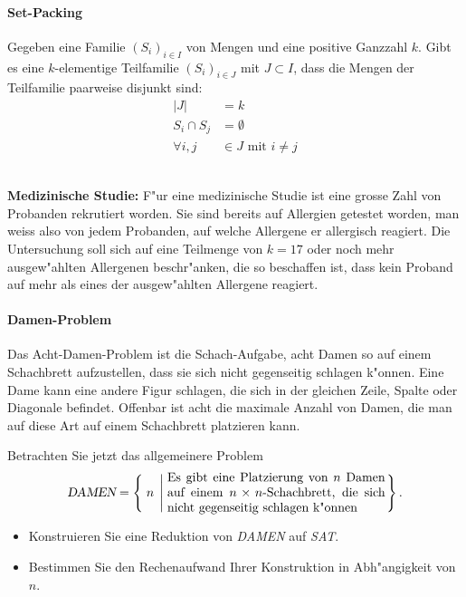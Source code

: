 \paragraph{Set-Packing} Gegeben eine Familie \( (S_i)_{i \in I} \) von Mengen und eine positive Ganzzahl \(k\). Gibt es eine \(k\)-elementige Teilfamilie \( (S_i)_{i \in J} \) mit \( J \subset I \), dass die Mengen der Teilfamilie paarweise disjunkt sind:
\begin{align*}
    \vert J \vert &= k \\
    S_i \cap S_j &= \emptyset \\
    \forall i,j &\in J \text{ mit } i \neq j
\end{align*}
\\
\textbf{Medizinische Studie:} F"ur eine medizinische Studie ist eine grosse Zahl von Probanden rekrutiert worden. Sie sind bereits auf Allergien getestet worden, man weiss also von jedem Probanden, auf welche Allergene er allergisch reagiert. Die Untersuchung soll sich auf eine Teilmenge von $k=17$ oder noch mehr ausgew"ahlten Allergenen beschr"anken, die so beschaffen ist, dass kein Proband auf mehr als  eines der ausgew"ahlten Allergene reagiert.
\paragraph{Damen-Problem}
Das Acht-Damen-Problem ist die Schach-Aufgabe, acht Damen so auf einem
Schachbrett aufzustellen, dass sie sich nicht gegenseitig schlagen k"onnen.
Eine Dame kann eine andere Figur schlagen, die sich in der gleichen Zeile,
Spalte oder Diagonale befindet.
Offenbar ist acht die maximale Anzahl von Damen, die man auf diese Art auf
einem Schachbrett platzieren kann.

Betrachten Sie jetzt das allgemeinere Problem
\[
\textsl{DAMEN}
=
\left\{\; n
\;\left|\;
\begin{minipage}{0.5\hsize}
Es gibt eine Platzierung von $n$ Damen auf einem $n\times n$-Schachbrett,
die sich nicht gegenseitig schlagen k"onnen
\end{minipage}\right.\right\}.
\]
\begin{itemize}
\item
Konstruieren Sie eine Reduktion von \textsl{DAMEN} auf \textsl{SAT}.
\item
Bestimmen Sie den Rechenaufwand Ihrer Konstruktion in Abh"angigkeit von $n$.
\end{itemize}

